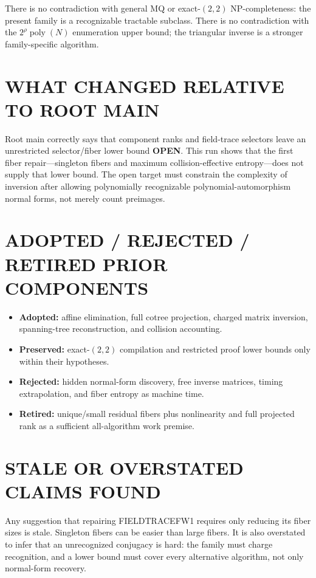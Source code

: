 \documentclass[11pt]{article}
\newcommand{\OPEN}{\textbf{OPEN}}
\begin{document}
There is no contradiction with general MQ or exact-$(2,2)$ NP-completeness:
the present family is a recognizable tractable subclass.  There is no
contradiction with the $2^\rho\operatorname{poly}(N)$ enumeration upper bound;
the triangular inverse is a stronger family-specific algorithm.

\section{WHAT CHANGED RELATIVE TO ROOT MAIN}
Root main correctly says that component ranks and field-trace selectors leave
an unrestricted selector/fiber lower bound \OPEN{}.  This run shows that the
first fiber repair---singleton fibers and maximum collision-effective
entropy---does not supply that lower bound.  The open target must constrain
the complexity of inversion after allowing polynomially recognizable
polynomial-automorphism normal forms, not merely count preimages.

\section{ADOPTED / REJECTED / RETIRED PRIOR COMPONENTS}
\begin{itemize}
\item \textbf{Adopted:} affine elimination, full cotree projection, charged
matrix inversion, spanning-tree reconstruction, and collision accounting.
\item \textbf{Preserved:} exact-$(2,2)$ compilation and restricted proof
lower bounds only within their hypotheses.
\item \textbf{Rejected:} hidden normal-form discovery, free inverse matrices,
timing extrapolation, and fiber entropy as machine time.
\item \textbf{Retired:} unique/small residual fibers plus nonlinearity and
full projected rank as a sufficient all-algorithm work premise.
\end{itemize}

\section{STALE OR OVERSTATED CLAIMS FOUND}
Any suggestion that repairing FIELDTRACEFW1 requires only reducing its fiber
sizes is stale.  Singleton fibers can be easier than large fibers.  It is also
overstated to infer that an unrecognized conjugacy is hard: the family must
charge recognition, and a lower bound must cover every alternative algorithm,
not only normal-form recovery.
\end{document}

